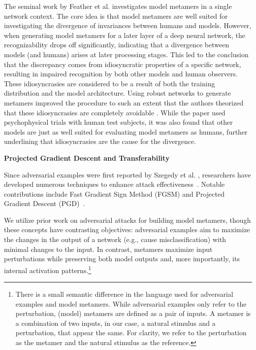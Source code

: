 \documentclass[pdflatex,sn-mathphys-num]{sn-jnl}%
\newcommand{\mmhead}[1]{\vspace{0.5cm}\noindent\textbf{#1}\vspace{0.3cm}}
\theoremstyle{thmstyleone}%
\theoremstyle{thmstyletwo}%
\theoremstyle{thmstylethree}%
\begin{document}
The seminal work by Feather et al. \cite{feather_metamers_2019, feather_model_2023} investigates model metamers in a single network context.
The core idea is that model metamers are well suited for investigating the divergence of invariances between humans and models.
However, when generating model metamers for a later layer of a deep neural network, the recognizability drops off significantly, indicating that a divergence between models (and humans) arises at later processing stages.
This led to the conclusion that the discrepancy comes from idiosyncratic properties of a specific network, resulting in impaired recognition by both other models and human observers.
These idiosyncrasies are considered to be a result of both the training distribution and the model architecture.
Using robust networks to generate metamers improved the procedure to such an extent that the authors theorized that these idiosyncrasies are completely avoidable \cite{feather_model_2023}.
While the paper used psychophysical trials with human test subjects,
it was also found that other models are just as well suited for evaluating model metamers as humans,
further underlining that idiosyncrasies are the cause for the divergence.

\mmhead{Projected Gradient Descent and Transferability} 

Since adversarial examples were first reported by Szegedy et al. \cite{szegedyIntriguing_2014}, researchers have developed numerous techniques to enhance attack effectiveness~\cite{croce2020reliable, schwinn2021dynamic}.
Notable contributions include Fast Gradient Sign Method (FGSM) \cite{goodfellow_explaining_2014} and Projected Gradient Descent (PGD)~\cite{madry_towards_2019,croce_robustbench_2021}.

We utilize prior work on adversarial attacks for building model metamers, though these concepts have contrasting objectives:
adversarial examples aim to maximize the changes in the output of a network (e.g., cause misclassification) with minimal changes to the input. In contrast, metamers maximize input perturbations while preserving both model outputs and, more importantly, its internal activation patterns.\footnote{
    There is a small semantic difference in the language used for adversarial examples and model metamers.
    While adversarial examples only refer to the perturbation, (model) metamers are defined as a pair of inputs.
    A metamer is a combination of two inputs, in our case, a natural stimulus and a perturbation, that appear the same.
    For clarity, we refer to the perturbation as the metamer and the natural stimulus as the reference.
}
\end{document}

